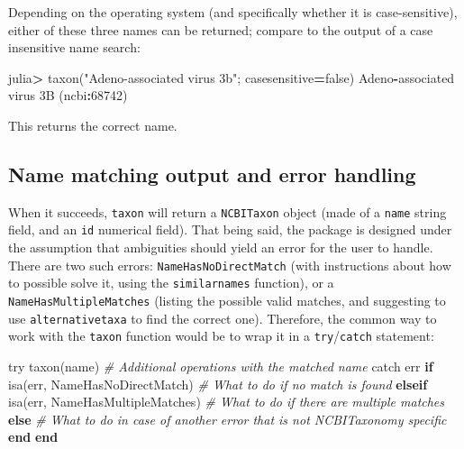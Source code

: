 \documentclass[11pt]{article}
\newenvironment{Shaded}{\begin{snugshade}}{\end{snugshade}}
\newcommand{\KeywordTok}[1]{\textcolor[rgb]{0.13,0.29,0.53}{\textbf{#1}}}
\newcommand{\FloatTok}[1]{\textcolor[rgb]{0.00,0.00,0.81}{#1}}
\newcommand{\ConstantTok}[1]{\textcolor[rgb]{0.00,0.00,0.00}{#1}}
\newcommand{\StringTok}[1]{\textcolor[rgb]{0.31,0.60,0.02}{#1}}
\newcommand{\CommentTok}[1]{\textcolor[rgb]{0.56,0.35,0.01}{\textit{#1}}}
\newcommand{\FunctionTok}[1]{\textcolor[rgb]{0.00,0.00,0.00}{#1}}
\newcommand{\ControlFlowTok}[1]{\textcolor[rgb]{0.13,0.29,0.53}{\textbf{#1}}}
\newcommand{\OperatorTok}[1]{\textcolor[rgb]{0.81,0.36,0.00}{\textbf{#1}}}
\newcommand{\NormalTok}[1]{#1}
\begin{document}
Depending on the operating system (and specifically whether it is
case-sensitive), either of these three names can be returned; compare to
the output of a case insensitive name search:

\begin{Shaded}
\begin{Highlighting}[]
\NormalTok{julia}\OperatorTok{\textgreater{}} \FunctionTok{taxon}\NormalTok{(}\StringTok{"Adeno{-}associated virus 3b"}\NormalTok{; casesensitive}\OperatorTok{=}\ConstantTok{false}\NormalTok{)}
\NormalTok{Adeno}\OperatorTok{{-}}\NormalTok{associated virus }\FloatTok{3}\NormalTok{B (ncbi}\OperatorTok{:}\FloatTok{68742}\NormalTok{)}
\end{Highlighting}
\end{Shaded}

This returns the correct name.

\hypertarget{name-matching-output-and-error-handling}{%
\subsection{Name matching output and error
handling}\label{name-matching-output-and-error-handling}}

When it succeeds, \texttt{taxon} will return a \texttt{NCBITaxon} object
(made of a \texttt{name} string field, and an \texttt{id} numerical
field). That being said, the package is designed under the assumption
that ambiguities should yield an error for the user to handle. There are
two such errors: \texttt{NameHasNoDirectMatch} (with instructions about
how to possible solve it, using the \texttt{similarnames} function), or
a \texttt{NameHasMultipleMatches} (listing the possible valid matches,
and suggesting to use \texttt{alternativetaxa} to find the correct one).
Therefore, the common way to work with the \texttt{taxon} function would
be to wrap it in a \texttt{try}/\texttt{catch} statement:

\begin{Shaded}
\begin{Highlighting}[]
\NormalTok{try}
  \FunctionTok{taxon}\NormalTok{(name)}
  \CommentTok{\# Additional operations with the matched name}
\NormalTok{catch err}
  \ControlFlowTok{if} \FunctionTok{isa}\NormalTok{(err, NameHasNoDirectMatch)}
    \CommentTok{\# What to do if no match is found}
  \ControlFlowTok{elseif} \FunctionTok{isa}\NormalTok{(err, NameHasMultipleMatches)}
    \CommentTok{\# What to do if there are multiple matches}
  \ControlFlowTok{else}
    \CommentTok{\# What to do in case of another error that is not NCBITaxonomy specific}
  \ControlFlowTok{end}
\KeywordTok{end}
\end{Highlighting}
\end{Shaded}
\end{document}
